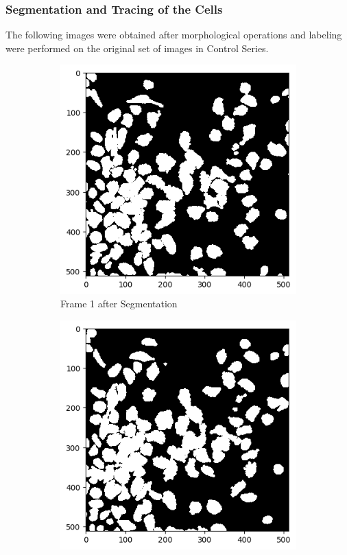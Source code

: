 \documentclass{article}
\begin{document}
\subsubsection*{Segmentation and Tracing of the Cells}
The following images were obtained after morphological operations and labeling were performed on the original set of images in Control Series. 
\begin{figure}[h!]
  \centering
  \begin{subfigure}{0.4\textwidth}
    \includegraphics[width=\linewidth]{Report/Appendix_Images/Segmentation-A-Control/frame_1.png}
    \caption*{Frame 1 after Segmentation}
  \end{subfigure}
  \hfill
  \begin{subfigure}{0.4\textwidth}
    \includegraphics[width=\linewidth]{Report/Appendix_Images/Segmentation-A-Control/frame_2.png}

\end{subfigure}
\end{figure}
\end{document}
